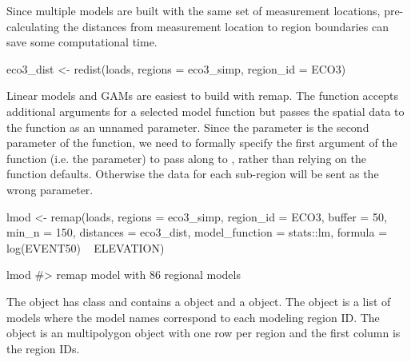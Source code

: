 Since multiple models are built with the same set of measurement locations, pre-calculating the distances from measurement location to region boundaries can save some computational time.

\begin{example}
eco3_dist <- redist(loads, regions = eco3_simp, region_id = ECO3)
\end{example}

Linear models and GAMs are easiest to build with remap. The  function accepts additional arguments for a selected model function but passes the spatial data to the function as an unnamed parameter. Since the  parameter is the second parameter of the  function, we need to formally specify the first argument of the function (i.e. the  parameter) to pass along to , rather than relying on the  function defaults. Otherwise the data for each sub-region will be sent as the wrong parameter.

\begin{example}
lmod <- remap(loads, regions = eco3_simp, region_id = ECO3,
              buffer = 50, min_n = 150,
              distances = eco3_dist,
              model_function = stats::lm,
              formula = log(EVENT50) ~ ELEVATION)
              
lmod
#> remap model with 86 regional models
\end{example}


The  object has class  and contains a  object and a  object. The  object is a list of  models where the model names correspond to each modeling region ID. The  object is an  multipolygon object with one row per region and the first column is the region IDs.



